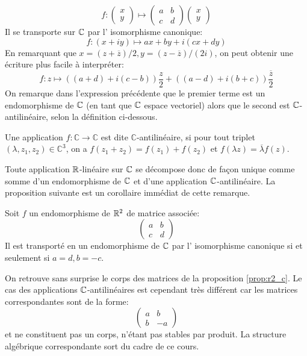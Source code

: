 \[
f \colon \begin{pmatrix}
x \\ y
\end{pmatrix}  \mapsto \begin{pmatrix}
a & b \\
c & d 
\end{pmatrix}\begin{pmatrix}
x \\ y
\end{pmatrix}
\]
Il se transporte sur $\mathbb{C}$ par l' isomorphisme canonique:
\[
f \colon (x+iy) \mapsto ax + by + i \left(cx + dy\right)
\]
En remarquant que $x = (z+\overline{z})/2, y = (z - \overline{z})/(2i)$, on peut obtenir une écriture plus facile à interpréter:
\[
f \colon z \mapsto \left((a+d)+i(c-b)\right)\frac{z}{2} + \left((a-d)+i(b+c)\right)\frac{\overline{z}}{2}
\]
On remarque dans l'expression précédente que le premier terme est un endomorphisme de $\mathbb{C}$ (en tant que $\mathbb{C}$ espace vectoriel) alors que le second est $\mathbb{C}$-antilinéaire, selon la définition ci-dessous.
\begin{fdefn}
Une application $f \colon \mathbb{C} \to \mathbb{C}$ est dite $\mathbb{C}$-antilinéaire, si pour tout triplet $(\lambda,z_1,z_2) \in \mathbb{C}^3$, on a $f(z_1 + z_2) = f(z_1)+f(z_2)$ et $f(\lambda z)= \overline{\lambda} f(z)$.
\end{fdefn}
Toute application $\mathbb R$-linéaire sur $\mathbb{C}$ se décompose donc de façon unique comme somme d'un endomorphisme de $\mathbb{C}$ et d'une application $\mathbb{C}$-antilinéaire. La proposition suivante est un corollaire immédiat de cette remarque.
\begin{fprop}
\label{prop:endomorphisme_c}
Soit $f$ un endomorphisme de $\mathbb R^2$ de matrice associée:
\[
\begin{pmatrix}
a & b \\
c & d
\end{pmatrix}
\]
Il est transporté en un endomorphisme de $\mathbb{C}$ par l' isomorphisme canonique si et seulement si $a=d,b=-c$.
\end{fprop}
\begin{rem}
On retrouve sans surprise le corps des matrices de la proposition \ref{prop:r2_c}. Le cas des applications $\mathbb{C}$-antilinéaires est cependant très différent car les matrices correspondantes sont de la forme:
\[
\begin{pmatrix}
a & b \\
b & -a
\end{pmatrix}
\]
et ne constituent pas un corps, n'étant pas stables par produit. La structure algébrique correspondante sort du cadre de ce cours. 
\end{rem}

